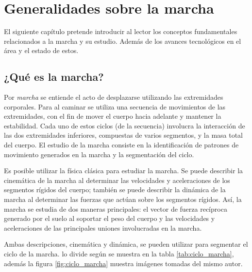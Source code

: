 \chapter[Generalidades]{Generalidades sobre la marcha}

El siguiente capítulo pretende introducir al lector los conceptos fundamentales relacionados a la marcha y su estudio. Además de los avances tecnológicos en el área y el estado de estos.

\section{¿Qué es la marcha?}

Por \emph{marcha} se entiende el acto de desplazarse utilizando las extremidades corporales. Para \cite{perry} al caminar se utiliza una secuencia de movimientos de las extremidades, con el fin de mover el cuerpo hacia adelante y mantener la estabilidad. Cada uno de estos ciclos (de la secuencia) involucra la interacción de las dos extremidades inferiores, compuestas de varios segmentos, y la masa total del cuerpo. El estudio de la marcha consiste en la identificación de patrones de movimiento generados en la marcha y la segmentación del ciclo.

Es posible utilizar la física clásica para estudiar la marcha. Se puede describir la cinemática de la marcha al determinar las velocidades y aceleraciones de los segmentos rígidos del cuerpo; también se puede describir la dinámica de la marcha al determinar las fuerzas que actúan sobre los segmentos rígidos. Así, la marcha se estudia de dos maneras principales: el vector de fuerza recíproca generado por el suelo al soportar el peso del cuerpo y las velocidades y aceleraciones de las principales uniones involucradas en la marcha. \citep{perry}

Ambas descripciones, cinemática y dinámica, se pueden utilizar para segmentar el ciclo de la marcha. \citep{perry} lo divide según se muestra en la tabla \ref{tab:ciclo_marcha}, además la figura \ref{fig:ciclo_marcha} muestra imágenes tomadas del mismo autor. 

